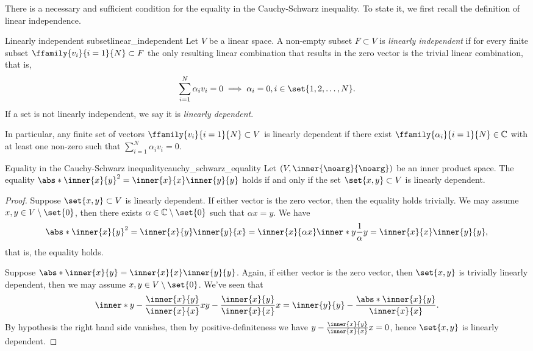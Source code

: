 There is a necessary and sufficient condition for the equality in the Cauchy-Schwarz inequality. To state it, we first recall the definition of linear independence.
\begin{definition}{Linearly independent subset}{linear_independent}
    Let \(V\) be a linear space. A non-empty subset \(F \subset V\) is \emph{linearly independent} if for every finite subset \(\ffamily{v_i}{i=1}{N} \subset F\) the only resulting linear combination that results in the zero vector is the trivial linear combination, that is,
    \begin{equation*}
        \sum_{i = 1}^N \alpha_i v_i = 0 \implies \alpha_i = 0, i \in \set{1,2,\dots,N}.
    \end{equation*}
    If a set is not linearly independent, we say it is \emph{linearly dependent}.
\end{definition}
\begin{remark}
    In particular, any finite set of vectors \(\ffamily{v_i}{i=1}{N}\subset V\) is linearly dependent if there exist \(\ffamily{\alpha_i}{i=1}{N} \in \mathbb{C}\) with at least one non-zero such that \(\sum_{i=1}^N \alpha_iv_i = 0\).
\end{remark}

\begin{proposition}{Equality in the Cauchy-Schwarz inequality}{cauchy_schwarz_equality}
    Let \((V, \inner{\noarg}{\noarg})\) be an inner product space. The equality \(\abs*{\inner{x}{y}}^2 = \inner{x}{x}\inner{y}{y}\) holds if and only if the set \(\set{x,y} \subset V\) is linearly dependent.
\end{proposition}
\begin{proof}
    Suppose \(\set{x,y} \subset V\) is linearly dependent. If either vector is the zero vector, then the equality holds trivially. We may assume \(x, y \in V\setminus\set{0}\), then there exists \(\alpha \in \mathbb{C}\setminus\set{0}\) such that \(\alpha x = y\). We have
    \begin{equation*}
        \abs*{\inner{x}{y}}^2 = \inner{x}{y}\inner{y}{x} = \inner{x}{\alpha x}\inner*{y}{\frac1\alpha y} = \inner{x}{x} \inner{y}{y},
    \end{equation*}
    that is, the equality holds.

    Suppose \(\abs*{\inner{x}{y}} = \inner{x}{x} \inner{y}{y}\). Again, if either vector is the zero vector, then \(\set{x,y}\) is trivially linearly dependent, then we may assume \(x, y \in V \setminus\set{0}\). We've seen that
    \begin{equation*}
        \inner*{y - \frac{\inner{x}{y}}{\inner{x}{x}}x}{y - \frac{\inner{x}{y}}{\inner{x}{x}}x} = \inner{y}{y} - \frac{\abs*{\inner{x}{y}}}{\inner{x}{x}}.
    \end{equation*}
    By hypothesis the right hand side vanishes, then by positive-definiteness we have \(y - \frac{\inner{x}{y}}{\inner{x}{x}}x = 0\), hence \(\set{x,y}\) is linearly dependent.
\end{proof}

